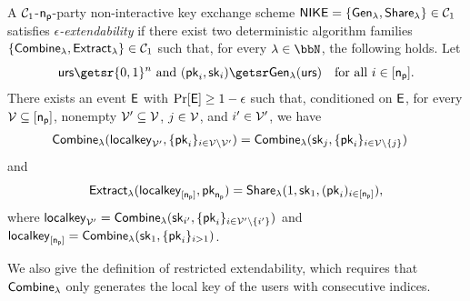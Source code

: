 \begin{definition}[Extendability]
\label{def:ext}
	A $\mathcal{C}_1$-$\mathsf{n_p}$-party non-interactive key exchange scheme $\mathsf{NIKE}=\{{\mathsf{Gen}}_\lambda,\allowbreak{\mathsf{Share}}_\lambda\} \in \mathcal{C}_1$ satisfies \emph{$\epsilon$-extendability} if there exist two deterministic algorithm families $\{\mathsf{Combine}_{\lambda}, \allowbreak\mathsf{Extract}_{\lambda} \} \in \mathcal{C}_1$ such that, for every $\lambda\in\N$, the following holds. Let
	\[
	\urs\getsr\bin^n\ \mbox{and}\
	(\pk_i,\sk_i)\getsr\gen(\urs)\quad\text{for all}\ i\in[\pnum].
	\]
	There exists an event $\mathsf{E}$ with $\Pr[\mathsf{E}]\geq 1-\epsilon$ such that, conditioned on $\mathsf{E}$, for every $\mathcal{V} \subseteq [\mathsf{n_p}]$, nonempty $\mathcal{V}' \subseteq \mathcal{V}$, $j \in \mathcal{V}$, and $i^{\prime} \in \mathcal{V}'$, we have
	\[\begin{split}\mathsf{Combine}_{\lambda}&(\mathsf{localkey}_{\mathcal{V}'}, \{\mathsf{pk}_i\}_{i \in \mathcal{V}\backslash\mathcal{V}'}) =
	 \mathsf{Combine}_{\lambda}(\mathsf{sk}_j, \{\mathsf{pk}_i\}_{i \in \mathcal{V}\backslash\{j\}})\end{split}\]
	and
	\[
	\mathsf{Extract}_{\lambda}(\mathsf{localkey}_{[\mathsf{n_p}]}, \mathsf{pk}_{\mathsf{n_p}}) = {\mathsf{Share}}_\lambda(1,\mathsf{sk}_1,(\mathsf{pk}_i)_{i\in{[\mathsf{n_p}]}}),
	\]
	where $\mathsf{localkey}_{\mathcal{V}'} = \mathsf{Combine}_{\lambda}(\mathsf{sk}_{i^{\prime}}, \allowbreak \{\mathsf{pk}_i\}_{i \allowbreak \in \mathcal{V}'\backslash\{i^{\prime}\}})$ and $\mathsf{localkey}_{[\mathsf{n_p}]} = \mathsf{Combine}_{\lambda}(\mathsf{sk}_{1}, \{\mathsf{pk}_i\}_{i >1})$.
\end{definition}
We also give the definition of restricted extendability, which requires that $\mathsf{Combine}_{\lambda}$ only generates the local key of the users with consecutive indices.

